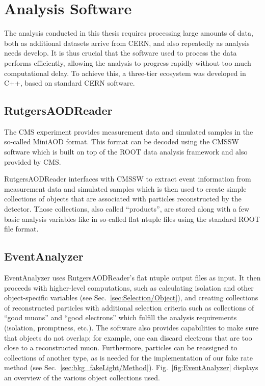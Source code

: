 \chapter{Analysis Software}
\label{app:Software}

The analysis conducted in this thesis requires processing large amounts of data, both as additional datasets arrive from CERN, and also repeatedly as analysis needs develop. It is thus crucial that the software used to process the data performs efficiently, allowing the analysis to progress rapidly without too much computational delay. To achieve this, a three-tier ecosystem was developed in C++, based on standard CERN software. 

\section{RutgersAODReader}
The CMS experiment provides measurement data and simulated samples in the so-called MiniAOD format. This format can be decoded using the CMSSW software \cite{CMSSW} which is built on top of the ROOT data analysis framework \cite{Brun:1997pa} and also provided by CMS.

RutgersAODReader interfaces with CMSSW to extract event information from measurement data and simulated samples which is then used to create simple collections of objects that are associated with particles reconstructed by the detector. Those collections, also called ``products'', are stored along with a few basic analysis variables like \MET in so-called flat ntuple files using the standard ROOT file format.

\section{EventAnalyzer}
\label{app:Software/EventAnalyzer}
EventAnalyzer uses RutgersAODReader's flat ntuple output files as input. It then proceeds with higher-level computations, such as calculating isolation and other object-specific variables (see Sec.~\ref{sec:Selection/Object}), and creating collections of reconstructed particles with additional selection criteria such as collections of ``good muons'' and ``good electrons'' which fulfill the analysis requirements (isolation, promptness, etc.). The software also provides capabilities to make sure that objects do not overlap; for example, one can discard electrons that are too close to a reconstructed muon. Furthermore, particles can be reassigned to collections of another type, as is needed for the implementation of our fake rate method (see Sec.~\ref{sec:bkg_fakeLight/Method}). Fig.~\ref{fig:EventAnalyzer} displays an overview of the various object collections used.

